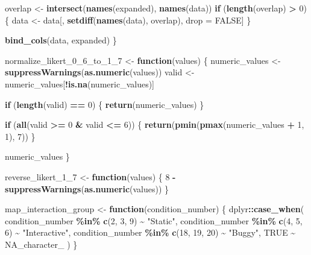 \documentclass[
]{article}
\newenvironment{Shaded}{\begin{snugshade}}{\end{snugshade}}
\newcommand{\ConstantTok}[1]{\textcolor[rgb]{0.56,0.35,0.01}{#1}}
\newcommand{\ControlFlowTok}[1]{\textcolor[rgb]{0.13,0.29,0.53}{\textbf{#1}}}
\newcommand{\DecValTok}[1]{\textcolor[rgb]{0.00,0.00,0.81}{#1}}
\newcommand{\FunctionTok}[1]{\textcolor[rgb]{0.13,0.29,0.53}{\textbf{#1}}}
\newcommand{\NormalTok}[1]{#1}
\newcommand{\OtherTok}[1]{\textcolor[rgb]{0.56,0.35,0.01}{#1}}
\newcommand{\SpecialCharTok}[1]{\textcolor[rgb]{0.81,0.36,0.00}{\textbf{#1}}}
\newcommand{\StringTok}[1]{\textcolor[rgb]{0.31,0.60,0.02}{#1}}
\begin{document}
\begin{Shaded}
\begin{Highlighting}[]
\NormalTok{  overlap }\OtherTok{\textless{}{-}} \FunctionTok{intersect}\NormalTok{(}\FunctionTok{names}\NormalTok{(expanded), }\FunctionTok{names}\NormalTok{(data))}
  \ControlFlowTok{if}\NormalTok{ (}\FunctionTok{length}\NormalTok{(overlap) }\SpecialCharTok{\textgreater{}} \DecValTok{0}\NormalTok{) \{}
\NormalTok{    data }\OtherTok{\textless{}{-}}\NormalTok{ data[, }\FunctionTok{setdiff}\NormalTok{(}\FunctionTok{names}\NormalTok{(data), overlap), drop }\OtherTok{=} \ConstantTok{FALSE}\NormalTok{]}
\NormalTok{  \}}

  \FunctionTok{bind\_cols}\NormalTok{(data, expanded)}
\NormalTok{\}}

\NormalTok{normalize\_likert\_0\_6\_to\_1\_7 }\OtherTok{\textless{}{-}} \ControlFlowTok{function}\NormalTok{(values) \{}
\NormalTok{  numeric\_values }\OtherTok{\textless{}{-}} \FunctionTok{suppressWarnings}\NormalTok{(}\FunctionTok{as.numeric}\NormalTok{(values))}
\NormalTok{  valid }\OtherTok{\textless{}{-}}\NormalTok{ numeric\_values[}\SpecialCharTok{!}\FunctionTok{is.na}\NormalTok{(numeric\_values)]}

  \ControlFlowTok{if}\NormalTok{ (}\FunctionTok{length}\NormalTok{(valid) }\SpecialCharTok{==} \DecValTok{0}\NormalTok{) \{}
    \FunctionTok{return}\NormalTok{(numeric\_values)}
\NormalTok{  \}}

  \ControlFlowTok{if}\NormalTok{ (}\FunctionTok{all}\NormalTok{(valid }\SpecialCharTok{\textgreater{}=} \DecValTok{0} \SpecialCharTok{\&}\NormalTok{ valid }\SpecialCharTok{\textless{}=} \DecValTok{6}\NormalTok{)) \{}
    \FunctionTok{return}\NormalTok{(}\FunctionTok{pmin}\NormalTok{(}\FunctionTok{pmax}\NormalTok{(numeric\_values }\SpecialCharTok{+} \DecValTok{1}\NormalTok{, }\DecValTok{1}\NormalTok{), }\DecValTok{7}\NormalTok{))}
\NormalTok{  \}}

\NormalTok{  numeric\_values}
\NormalTok{\}}

\NormalTok{reverse\_likert\_1\_7 }\OtherTok{\textless{}{-}} \ControlFlowTok{function}\NormalTok{(values) \{}
  \DecValTok{8} \SpecialCharTok{{-}} \FunctionTok{suppressWarnings}\NormalTok{(}\FunctionTok{as.numeric}\NormalTok{(values))}
\NormalTok{\}}

\NormalTok{map\_interaction\_group }\OtherTok{\textless{}{-}} \ControlFlowTok{function}\NormalTok{(condition\_number) \{}
\NormalTok{  dplyr}\SpecialCharTok{::}\FunctionTok{case\_when}\NormalTok{(}
\NormalTok{    condition\_number }\SpecialCharTok{\%in\%} \FunctionTok{c}\NormalTok{(}\DecValTok{2}\NormalTok{, }\DecValTok{3}\NormalTok{, }\DecValTok{9}\NormalTok{) }\SpecialCharTok{\textasciitilde{}} \StringTok{"Static"}\NormalTok{,}
\NormalTok{    condition\_number }\SpecialCharTok{\%in\%} \FunctionTok{c}\NormalTok{(}\DecValTok{4}\NormalTok{, }\DecValTok{5}\NormalTok{, }\DecValTok{6}\NormalTok{) }\SpecialCharTok{\textasciitilde{}} \StringTok{"Interactive"}\NormalTok{,}
\NormalTok{    condition\_number }\SpecialCharTok{\%in\%} \FunctionTok{c}\NormalTok{(}\DecValTok{18}\NormalTok{, }\DecValTok{19}\NormalTok{, }\DecValTok{20}\NormalTok{) }\SpecialCharTok{\textasciitilde{}} \StringTok{"Buggy"}\NormalTok{,}
    \ConstantTok{TRUE} \SpecialCharTok{\textasciitilde{}} \ConstantTok{NA\_character\_}
\NormalTok{  )}
\NormalTok{\}}


\end{Highlighting}
\end{Shaded}
\end{document}
